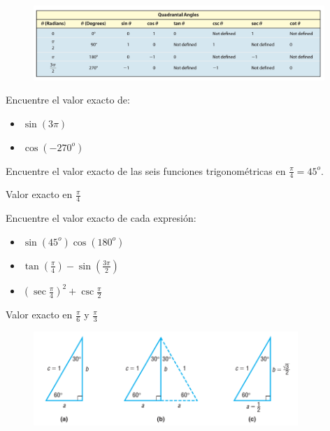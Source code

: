 {}
	\begin{figure}
		\centering
		\includegraphics[width=11cm,keepaspectratio=true]{./trig/sull06t2.png}
		\label{fig:06t2}
	\end{figure}
	

{}
	\begin{problema}
		\label{exmp:sull0603}
		Encuentre el valor exacto de:
		\begin{itemize}
			\item $\sin(3\pi)$ 
			\item $\cos(-270^{o})$
		\end{itemize}
	\end{problema}
	

{}
	\begin{problema}
		\label{exmp:sull0604}
		Encuentre el valor exacto de las seis funciones trigonométricas en $\frac{\pi}{4}=45^{o}$.
	\end{problema}
	

{Valor exacto en $\frac{\pi}{4}$}
	\begin{problema}
		\label{exmp:sull0605}
		Encuentre el valor exacto de cada expresión:
		\begin{itemize}
			\item $\sin(45^{o})\cos(180^{o})$
			\item $\tan\left( \frac{\pi}{4} \right)-\sin\left( \frac{3\pi}{2} \right)$
			\item $\left( \sec\frac{\pi}{4} \right)^{2}+\csc\frac{\pi}{2}$
		\end{itemize}
		
	\end{problema}
	

{Valor exacto en $\frac{\pi}{6}$ y $\frac{\pi}{3}$}
	\begin{figure}
		\centering
		\includegraphics[width=10cm,keepaspectratio=true]{./trig/sull0624.png}
		\label{fig:0624}
	\end{figure}
	

